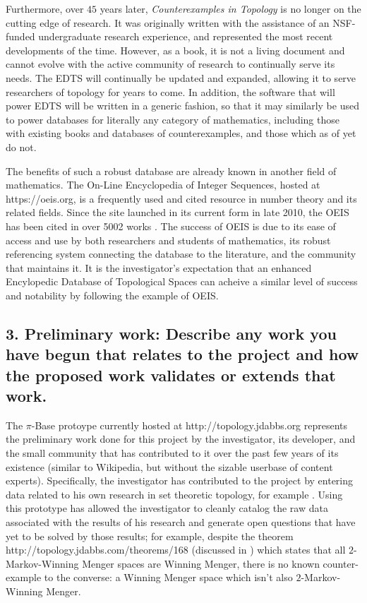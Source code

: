 \documentclass[10pt]{article}
\begin{document}
Furthermore, over \(45\) years later, \textit{Counterexamples in Topology}
is no longer on the cutting edge of research. It was originally written with
the assistance of an NSF-funded undergraduate research experience, and
represented the most recent developments of the time. However, as a book,
it is not a living document and cannot evolve with the active community of
research to continually serve its needs. The EDTS will continually be updated
and expanded, allowing it to serve researchers of topology for years to come.
In addition, the software that will power EDTS will be written in a generic
fashion, so that it may similarly be used to power databases for literally
any category of mathematics, including those with existing books and databases
of counterexamples, and those which as of yet do not.

The benefits of such a robust database are already known in another field of
mathematics. The On-Line Encyclopedia of Integer Sequences, hosted at
https://oeis.org, is a frequently used and cited resource in number theory
and its related fields.
Since the site launched in its current form in late 2010, the OEIS
has been cited in over 5002 works \cite{OEIScitations}. The success of OEIS
is due to its ease of access and use by both researchers and students of
mathematics, its robust referencing system connecting the database to the
literature, and the community that maintains it. It is the investigator's
expectation that an enhanced Encylopedic Database of Topological Spaces can
acheive a similar level of success and notability by following the example
of OEIS.







\subsection*{3. Preliminary work:  Describe any work you have begun that relates to the project and how the proposed work validates or extends that work.}

The \(\pi\)-Base protoype currently hosted at http://topology.jdabbs.org
represents the preliminary work done for this project by the investigator,
its developer, and the small community that has contributed to it
over the past few years of its existence (similar to Wikipedia, but without
the sizable userbase of content experts). Specifically, the investigator
has contributed to the project by entering data related to his own research
in set theoretic topology, for example
\cite{MR3467819,MR3482726,MR3227201,MR3438747}. Using this prototype has
allowed the investigator to cleanly catalog the raw data associated with
the results of his research and generate open questions that have yet to be
solved by those results; for example, despite the theorem
http://topology.jdabbs.com/theorems/168
(discussed in \cite{clontzMengerGamePreprint}) which states that all
\(2\)-Markov-Winning Menger spaces are Winning Menger, there is no known
counter-example to the converse: a Winning Menger space which isn't also
\(2\)-Markov-Winning Menger.
\end{document}
